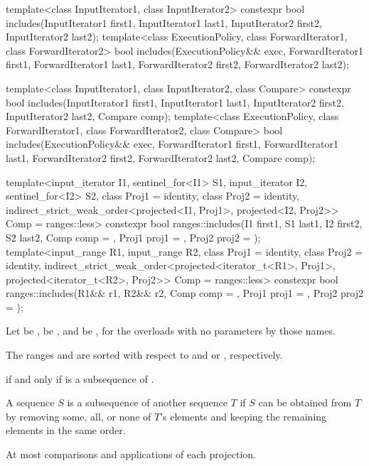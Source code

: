 %
\begin{itemdecl}
template<class InputIterator1, class InputIterator2>
  constexpr bool includes(InputIterator1 first1, InputIterator1 last1,
                          InputIterator2 first2, InputIterator2 last2);
template<class ExecutionPolicy, class ForwardIterator1, class ForwardIterator2>
  bool includes(ExecutionPolicy&& exec,
                ForwardIterator1 first1, ForwardIterator1 last1,
                ForwardIterator2 first2, ForwardIterator2 last2);

template<class InputIterator1, class InputIterator2, class Compare>
  constexpr bool includes(InputIterator1 first1, InputIterator1 last1,
                          InputIterator2 first2, InputIterator2 last2,
                          Compare comp);
template<class ExecutionPolicy, class ForwardIterator1, class ForwardIterator2, class Compare>
  bool includes(ExecutionPolicy&& exec,
                ForwardIterator1 first1, ForwardIterator1 last1,
                ForwardIterator2 first2, ForwardIterator2 last2,
                Compare comp);

template<input_iterator I1, sentinel_for<I1> S1, input_iterator I2, sentinel_for<I2> S2,
         class Proj1 = identity, class Proj2 = identity,
         indirect_strict_weak_order<projected<I1, Proj1>,
                                    projected<I2, Proj2>> Comp = ranges::less>
  constexpr bool ranges::includes(I1 first1, S1 last1, I2 first2, S2 last2, Comp comp = {},
                                  Proj1 proj1 = {}, Proj2 proj2 = {});
template<input_range R1, input_range R2, class Proj1 = identity,
         class Proj2 = identity,
         indirect_strict_weak_order<projected<iterator_t<R1>, Proj1>,
                                    projected<iterator_t<R2>, Proj2>> Comp = ranges::less>
  constexpr bool ranges::includes(R1&& r1, R2&& r2, Comp comp = {},
                                  Proj1 proj1 = {}, Proj2 proj2 = {});
\end{itemdecl}

\begin{itemdescr}
\pnum
Let  be ,
 be , and
 be ,
for the overloads with no parameters by those names.

\pnum
\expects
The ranges  and  are sorted
with respect to  and  or , respectively.

\pnum
\returns
{}
if and only if  is a subsequence of .
\begin{note}
A sequence $S$ is a subsequence of another sequence $T$ if $S$ can be obtained
from $T$ by removing some, all, or none of $T$'s elements and keeping the
remaining elements in the same order.
\end{note}

\pnum
\complexity
At most 
comparisons and applications of each projection.
\end{itemdescr}

